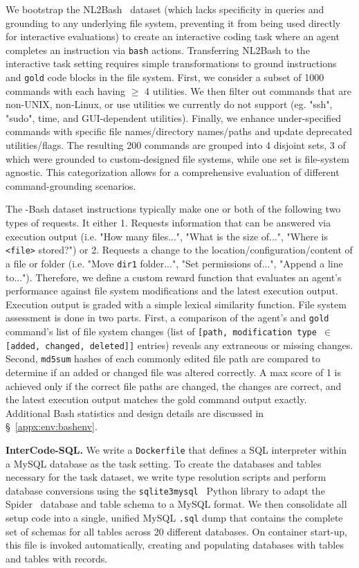 We bootstrap the NL2Bash~\cite{lin-etal-2018-nl2bash} dataset (which lacks specificity in queries and grounding to any underlying file system, preventing it from being used directly for interactive evaluations) to create an interactive coding task where an agent completes an instruction via \texttt{bash} actions. Transferring NL2Bash to the interactive task setting requires simple transformations to ground instructions and \texttt{gold} code blocks in the file system. First, we consider a subset of 1000 commands with each having $\geq$ 4 utilities. We then filter out commands that are non-UNIX, non-Linux, or use utilities we currently do not support (eg. "ssh", "sudo", time, and GUI-dependent utilities). Finally, we enhance under-specified commands with specific file names/directory names/paths and update deprecated utilities/flags. The resulting 200 commands are grouped into 4 disjoint sets, 3 of which were grounded to custom-designed file systems, while one set is file-system agnostic. This categorization allows for a comprehensive evaluation of different command-grounding scenarios.

The \benchmark{}-Bash dataset instructions typically make one or both of the following two types of requests. It either
1. Requests information that can be answered via execution output (i.e. "How many files...", "What is the size of...", "Where is \texttt{<file>} stored?") or
2. Requests a change to the location/configuration/content of a file or folder (i.e. "Move \texttt{dir1} folder...", "Set permissions of...", "Append a line to...").
Therefore, we define a custom reward function that evaluates an agent's performance against file system modifications and the latest execution output.
Execution output is graded with a simple lexical similarity function.
File system assessment is done in two parts. First, a comparison of the agent's and \texttt{gold} command's list of file system changes (list of \texttt{[path, modification type $\in$ [added, changed, deleted]]} entries) reveals any extraneous or missing changes.
Second, \texttt{md5sum} hashes of each commonly edited file path are compared to determine if an added or changed file was altered correctly.
A max score of 1 is achieved only if the correct file paths are changed, the changes are correct, and the latest execution output matches the gold command output exactly. Additional Bash statistics and design details are discussed in \S~\ref{appx:env:bashenv}.

\textbf{InterCode-SQL.} We write a \texttt{Dockerfile} that defines a SQL interpreter within a MySQL database as the task setting.
To create the databases and tables necessary for the task dataset, we write type resolution scripts and perform database conversions using the \texttt{sqlite3mysql}~\cite{sqlite3mysql} Python library to adapt the Spider~\cite{yu-etal-2018-spider} database and table schema to a MySQL format.
We then consolidate all setup code into a single, unified MySQL \texttt{.sql} dump that contains the complete set of schemas for all tables across 20 different databases.
On container start-up, this file is invoked automatically, creating and populating databases with tables and tables with records.

